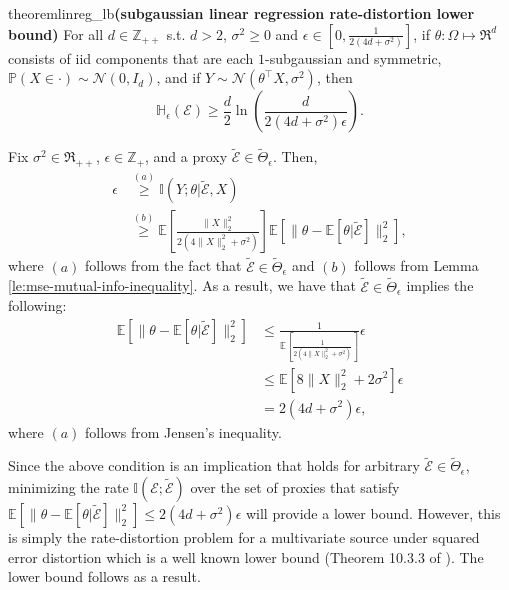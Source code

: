 \documentclass[twoside,11pt]{article}
\renewenvironment{proof}{\par\noindent{\bf Proof\ }}{\hfill\BlackBox\\[2mm]}
\newenvironment{proof}{\par\noindent{\bf Proof\ }}{\hfill\BlackBox\\[2mm]}
\def\environment{\mathcal{E}}
\def\proxy{\tilde{\environment}}
\def\proxyset{\tilde{\Theta}}
\def\normal{\mathcal{N}}
\def\E{\mathbb{E}}
\def\H{\mathbb{H}}
\def\I{\mathbb{I}}
\def\Pr{\mathbb{P}}
\begin{document}
\begin{restatable}{theorem}{linreg_lb}{\bf (subgaussian linear regression rate-distortion lower bound)}
\label{th:linear-regression-rate-distortion-lower-bound}
For all $d \in \mathbb{Z}_{++}$ s.t. $d > 2$, $\sigma^2 \geq 0$ and $\epsilon \in\left[0, \frac{1}{2(4d+\sigma^2)}\right]$, if $\theta:\Omega\mapsto\Re^d$ consists of iid components that are each $1$-subgaussian and symmetric, $\Pr(X\in\cdot)\sim \normal(0, I_d)$, and if $Y \sim \normal(\theta^\top X, \sigma^2)$, then
$$\H_{\epsilon}(\environment) \geq \frac{d}{2}\ln\left(\frac{d}{2\left(4d +\sigma^2\right)\epsilon}\right).$$ 
\end{restatable}
\begin{proof}
    Fix $\sigma^2 \in \Re_{++}$, $\epsilon \in \mathbb{Z}_+$, and a proxy $\proxy \in \proxyset_\epsilon$. Then,
    \begin{align*}
        \epsilon
        & \overset{(a)}{\geq}  \I(Y;\theta|\proxy, X)\\
        & \overset{(b)}{\geq} \E\left[\frac{\|X\|_2^2}{2(4\|X\|_2^2+\sigma^2)}\right]\E\left[\|\theta-\E[\theta|\proxy]\|^2_2\right],
    \end{align*}
    where $(a)$ follows from the fact that $\proxy \in \proxyset_\epsilon$ and $(b)$ follows from Lemma \ref{le:mse-mutual-info-inequality}. As a result, we have that $\proxy\in\proxyset_\epsilon$ implies the following:
    \begin{align*}
        \E\left[\|\theta-\E[\theta|\proxy]\|^2_2\right]
        & \leq \frac{1}{\E\left[\frac{1}{2(4\|X\|_2^2+\sigma^2)}\right]}\epsilon\\
        & \leq \E\left[8\|X\|^2_2 + 2\sigma^2\right]\epsilon\\
        & = 2(4d+\sigma^2)\epsilon,
    \end{align*}
    where $(a)$ follows from Jensen's inequality.
    
    Since the above condition is an implication that holds for arbitrary $\proxy\in\proxyset_\epsilon$, minimizing the rate $\I(\environment;\proxy)$ over the set of proxies that satisfy 
    $\E\left[\|\theta-\E[\theta|\proxy]\|^2_2\right] \leq 2\left(4d + \sigma^2\right) \epsilon$ will provide a lower bound. However, this is simply the rate-distortion problem for a multivariate source under squared error distortion which is a well known lower bound (Theorem 10.3.3 of \citep{10.5555/1146355}). The lower bound follows as a result.\newline
\end{proof}
\end{document}
